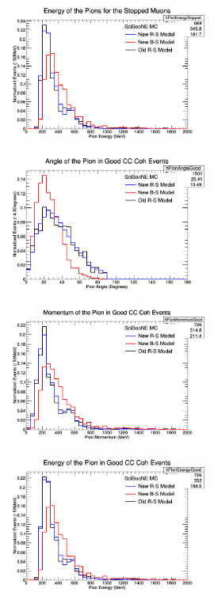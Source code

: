 \documentclass[11pt]{article}
\begin{document}
\begin{figure}[H]
\centering
\includegraphics[width=0.6\textwidth]{NMPionPlottingImages/6-NMPionPlotting.png}
\caption{}
\end{figure}

\begin{figure}[H]
\centering
\includegraphics[width=0.6\textwidth]{NMPionPlottingImages/7-NMPionPlotting.png}
\caption{}
\end{figure}

\begin{figure}[H]
\centering
\includegraphics[width=0.6\textwidth]{NMPionPlottingImages/8-NMPionPlotting.png}
\caption{}
\end{figure}

\begin{figure}[H]
\centering
\includegraphics[width=0.6\textwidth]{NMPionPlottingImages/9-NMPionPlotting.png}
\caption{}
\end{figure}
\end{document}
